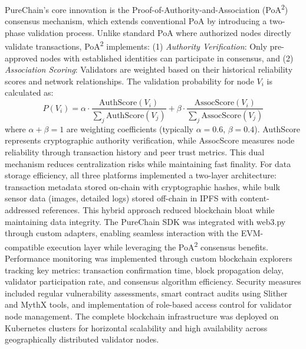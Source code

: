 \documentclass[final,5p,times,twocolumn]{elsarticle}
\begin{document}
PureChain's core innovation is the Proof-of-Authority-and-Association (PoA\textsuperscript{2}) consensus mechanism, which extends conventional PoA by introducing a two-phase validation process. Unlike standard PoA where authorized nodes directly validate transactions, PoA\textsuperscript{2} implements: (1) \textit{Authority Verification}: Only pre-approved nodes with established identities can participate in consensus, and (2) \textit{Association Scoring}: Validators are weighted based on their historical reliability scores and network relationships. The validation probability for node $V_i$ is calculated as:
\begin{equation}
P(V_i) = \alpha \cdot \frac{\text{AuthScore}(V_i)}{\sum_j \text{AuthScore}(V_j)} + \beta \cdot \frac{\text{AssocScore}(V_i)}{\sum_j \text{AssocScore}(V_j)}
\label{equ:poa2}
\end{equation}
where $\alpha + \beta = 1$ are weighting coefficients (typically $\alpha=0.6$, $\beta=0.4$). AuthScore represents cryptographic authority verification, while AssocScore measures node reliability through transaction history and peer trust metrics. This dual mechanism reduces centralization risks while maintaining fast finality. For data storage efficiency, all three platforms implemented a two-layer architecture: transaction metadata stored on-chain with cryptographic hashes, while bulk sensor data (images, detailed logs) stored off-chain in IPFS with content-addressed references. This hybrid approach reduced blockchain bloat while maintaining data integrity. The PureChain SDK was integrated with web3.py through custom adapters, enabling seamless interaction with the EVM-compatible execution layer while leveraging the PoA\textsuperscript{2} consensus benefits. Performance monitoring was implemented through custom blockchain explorers tracking key metrics: transaction confirmation time, block propagation delay, validator participation rate, and consensus algorithm efficiency. Security measures included regular vulnerability assessments, smart contract audits using Slither and MythX tools, and implementation of role-based access control for validator node management. The complete blockchain infrastructure was deployed on Kubernetes clusters for horizontal scalability and high availability across geographically distributed validator nodes.
\end{document}
